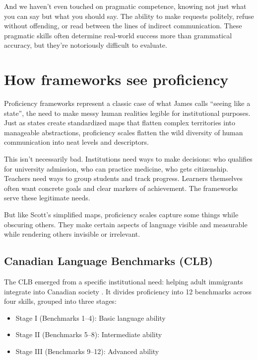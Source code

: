 And we haven't even touched on pragmatic competence, knowing not just what you can say but what you should say. The ability to make requests politely, refuse without offending, or read between the lines of indirect communication. These pragmatic skills often determine real-world success more than grammatical accuracy, but they're notoriously difficult to evaluate.

\section{How frameworks see proficiency}

Proficiency frameworks represent a classic case of what James \textcite{scott1998} calls \enquote{seeing like a state}, the need to make messy human realities legible for institutional purposes. Just as states create standardized maps that flatten complex territories into manageable abstractions, proficiency scales flatten the wild diversity of human communication into neat levels and descriptors.

This isn't necessarily bad. Institutions need ways to make decisions: who qualifies for university admission, who can practice medicine, who gets citizenship. Teachers need ways to group students and track progress. Learners themselves often want concrete goals and clear markers of achievement. The frameworks serve these legitimate needs.

But like Scott's simplified maps, proficiency scales capture some things while obscuring others. They make certain aspects of language visible and measurable while rendering others invisible or irrelevant.

\subsection{Canadian Language Benchmarks (CLB)}

The CLB emerged from a specific institutional need: helping adult immigrants integrate into Canadian society \citep{CCLB2012}. It divides proficiency into 12 benchmarks across four skills, grouped into three stages:

\begin{itemize}[noitemsep]
\item Stage I (Benchmarks 1--4): Basic language ability
\item Stage II (Benchmarks 5--8): Intermediate ability
\item Stage III (Benchmarks 9--12): Advanced ability
\end{itemize}

